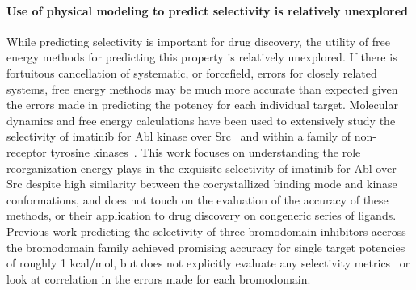 \documentclass[9pt,lineno]{elife-modified} %
\begin{document}
\paragraph{Use of physical modeling to predict selectivity is relatively unexplored}
While predicting selectivity is important for drug discovery, the utility of free energy methods for predicting this property is relatively unexplored. If there is fortuitous cancellation of systematic, or forcefield, errors for closely related systems, free energy methods may be much more accurate than expected given the errors made in predicting the potency for each individual target. Molecular dynamics and free energy calculations have been used to extensively study the selectivity of imatinib for Abl kinase over Src~\citep{Lin2013-ft,Lin2014-iv} and within a family of non-receptor tyrosine kinases~\citep{Lin2013-mu}. This work focuses on understanding the role reorganization energy plays in the exquisite selectivity of imatinib for Abl over Src despite high similarity between the cocrystallized binding mode and kinase conformations, and does not touch on the evaluation of the accuracy of these methods, or their application to drug discovery on congeneric series of ligands. Previous work predicting the selectivity of three bromodomain inhibitors accross the bromodomain family achieved promising accuracy for single target potencies of roughly 1 kcal/mol, but does not explicitly evaluate any selectivity metrics~\citep{Aldeghi2017-ox} or look at correlation in the errors made for each bromodomain. 
\end{document}
